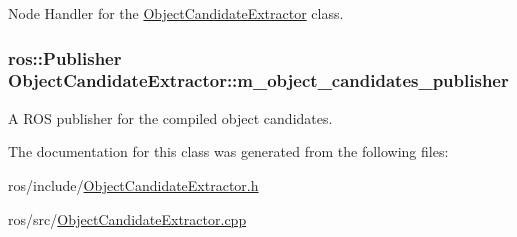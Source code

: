 \-Node \-Handler for the \hyperlink{class_object_candidate_extractor}{\-Object\-Candidate\-Extractor} class. 

\hypertarget{class_object_candidate_extractor_a3b5cd0451266eafe0aba2d950a7434e8}{
\subsubsection[{m\-\_\-object\-\_\-candidates\-\_\-publisher}]{\setlength{\rightskip}{0pt plus 5cm}ros\-::\-Publisher {\bf \-Object\-Candidate\-Extractor\-::m\-\_\-object\-\_\-candidates\-\_\-publisher}}}\label{class_object_candidate_extractor_a3b5cd0451266eafe0aba2d950a7434e8}


\-A \-R\-O\-S publisher for the compiled object candidates. 



\-The documentation for this class was generated from the following files\-:\begin{DoxyCompactItemize}
\item 
ros/include/\hyperlink{_object_candidate_extractor_8h}{\-Object\-Candidate\-Extractor.\-h}\item 
ros/src/\hyperlink{_object_candidate_extractor_8cpp}{\-Object\-Candidate\-Extractor.\-cpp}\end{DoxyCompactItemize}
